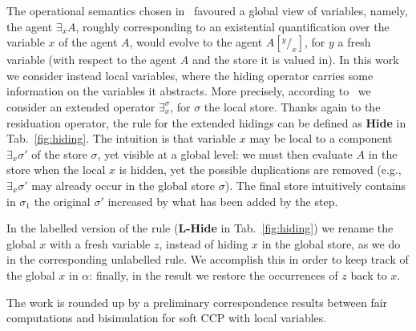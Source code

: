 \documentclass[submission,copyright,creativecommons]{eptcs}
\begin{document}
The operational semantics chosen in~\cite{coord} favoured a global view of  variables, namely, the agent $\exists_x A$, roughly 
corresponding to an existential quantification over the variable $x$ of the agent $A$, would evolve to the agent 
$A[^y/_x]$, for $y$ a fresh variable (with respect to the agent $A$ and the store it is valued in).
In this work we consider instead local variables, where the hiding operator carries some information on the variables it abstracts.
More precisely, according to~\cite{extendedHiding} we consider an extended operator $\exists_x^\sigma$, for $\sigma$ the local store.
Thanks again to the residuation operator, the rule for the extended hidings can be defined as {\bf Hide} in Tab.~\ref{fig:hiding}. The intuition is that variable $x$ may be local to a component $\exists_x \sigma'$ of the store $\sigma$, yet visible at a global level: we must then evaluate $A$ in the store
when the local $x$ is hidden, yet the possible duplications are removed (e.g., $\exists_x \sigma'$ may already occur in the global store $\sigma$). The final store intuitively contains in $\sigma_1$ the original $\sigma'$ increased by what has been added by the step. 

In the labelled version of the rule ({\bf L-Hide} in Tab.~\ref{fig:hiding}) we rename the global $x$ with a fresh variable $z$, instead of hiding $x$ in the global store, as we do in the corresponding unlabelled rule. We accomplish this in order
to keep track of the global $x$ in $\alpha$: finally, in the result we restore the occurrences of $z$ back to $x$.

The work is rounded up by a preliminary correspondence results between fair computations and bisimulation for soft CCP with 
local variables.

%
\end{document}
